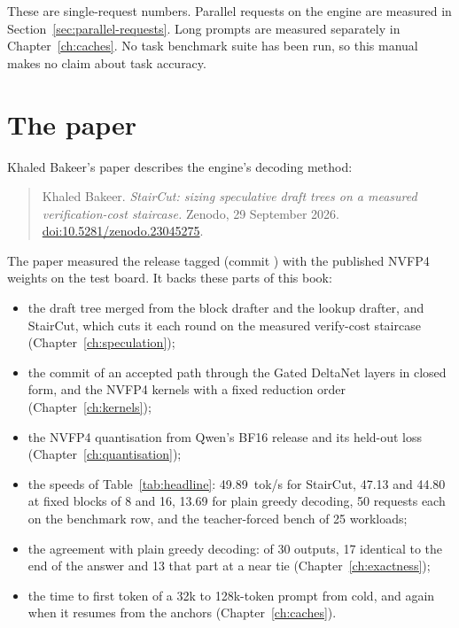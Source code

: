 These are single-request numbers. Parallel requests on the engine are measured in Section~\ref{sec:parallel-requests}. Long prompts are measured separately in Chapter~\ref{ch:caches}. No task benchmark suite has been run, so this manual makes no claim about task accuracy.

\section{The paper}\label{sec:paper}

Khaled Bakeer's paper describes the engine's decoding method:

\begin{quote}
Khaled Bakeer. \emph{StairCut: sizing speculative draft trees on a measured verification-cost staircase.} Zenodo, 29 September 2026. \href{https://doi.org/10.5281/zenodo.23045275}{doi:10.5281/zenodo.23045275}.
\end{quote}

The paper measured the release tagged  (commit ) with the published NVFP4 weights on the test board. It backs these parts of this book:

\begin{itemize}
\item the draft tree merged from the block drafter and the lookup drafter, and StairCut, which cuts it each round on the measured verify-cost staircase (Chapter~\ref{ch:speculation});
\item the commit of an accepted path through the Gated DeltaNet layers in closed form, and the NVFP4 kernels with a fixed reduction order (Chapter~\ref{ch:kernels});
\item the NVFP4 quantisation from Qwen's BF16 release and its held-out loss (Chapter~\ref{ch:quantisation});
\item the speeds of Table~\ref{tab:headline}: 49.89~tok/s for StairCut, 47.13 and 44.80 at fixed blocks of 8 and 16, 13.69 for plain greedy decoding, 50 requests each on the benchmark row, and the teacher-forced bench of 25 workloads;
\item the agreement with plain greedy decoding: of 30 outputs, 17 identical to the end of the answer and 13 that part at a near tie (Chapter~\ref{ch:exactness});
\item the time to first token of a 32k to 128k-token prompt from cold, and again when it resumes from the anchors (Chapter~\ref{ch:caches}).
\end{itemize}

